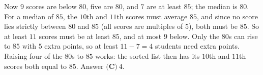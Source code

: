 Now $9$ scores are below $80$, five are $80$, and $7$ are at least $85$; the median is $80$. For a median of $85$, the $10$th and $11$th scores must average $85$, and since no score lies strictly between $80$ and $85$ (all scores are multiples of $5$), both must be $85$. So at least $11$ scores must be at least $85$, and at most $9$ below. Only the $80$s can rise to $85$ with $5$ extra points, so at least $11-7=4$ students need extra points. Raising four of the $80$s to $85$ works: the sorted list then has its $10$th and $11$th scores both equal to $85$. Answer $\boxed{\textbf{(C)}\ 4}$.
